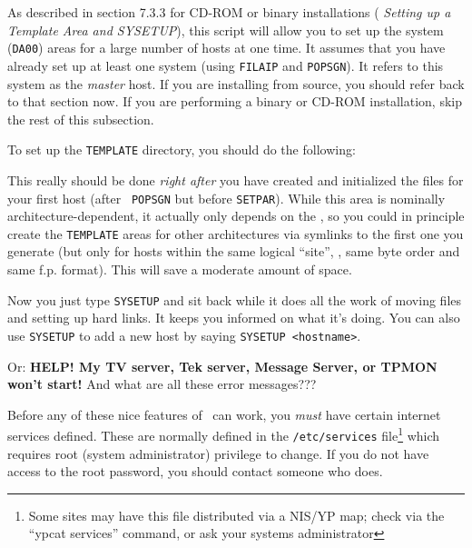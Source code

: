\medskip{}

As described in section 7.3.3 for CD-ROM or binary installations ({\it
Setting up a Template Area and SYSETUP\/}), this script will allow you
to set up the system ({\tt DA00}) areas for a large number of hosts at
one time.  It assumes that you have already set up at least one system
(using {\tt FILAIP} and {\tt POPSGN}).  It refers to this system as the
{\it master\/} host.  If you are installing from source, you should
refer back to that section now.  If you are performing a binary or
CD-ROM installation, skip the rest of this subsection.

To set up the {\tt TEMPLATE} directory, you should do the
following:\medskip

\medskip

\noindent This really should be done {\it right after\/} you have
created and initialized the files for your first host (after {\tt
POPSGN} but before {\tt SETPAR}).  While this area is nominally
architecture-dependent, it actually only depends on the \SITE, so you
could in principle create the {\tt TEMPLATE} areas for other
architectures via symlinks to the first one you generate (but only for
hosts within the same logical ``site'', \ie, same byte order and same
f.p. format).  This will save a moderate amount of space.

Now you just type {\tt SYSETUP} and sit back while it does all the work
of moving files and setting up hard links.  It keeps you informed on
what it's doing.  You can also use {\tt SYSETUP} to add a new host by
saying {\tt SYSETUP <hostname>}.

\medskip{}

Or: {\bf HELP!  My TV server, Tek server, Message Server, or TPMON won't
start!}  And what are all these error messages???

Before any of these nice features of \AIPS\ can work, you {\it must\/}
have certain internet services defined.  These are normally defined in
the {\tt /etc/services} file\footnote*{\eightrm Some sites may have
                                       this file distributed via a
                                       NIS/YP map; check via the ``ypcat
                                       services'' command, or ask your
                                       systems administrator}
which requires root (system administrator) privilege to change.  If you
do not have access to the root password, you should contact someone who
does.

